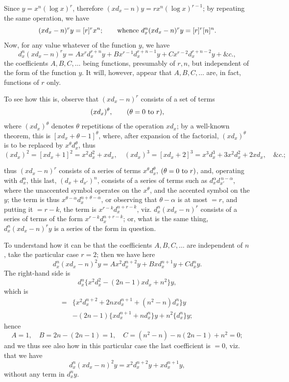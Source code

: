 \documentclass[10pt,twoside]{article}
\begin{document}
Since \(y=x^n(\log x)^r\), therefore \((xd_x-n)y=rx^n(\log x)^{r-1}\);
by repeating the same operation, we have
\[
        (xd_x-n)^r y=[r]^r x^n;\qquad
        \hbox{whence }d_x^n(xd_x-n)^r y=[r]^r[n]^n.
\]
Now, for any value whatever of the function \(y\), we have
\[
d_x^n(xd_x-n)^r y
=Ax^r d_x^{r+n}y+Bx^{r-1}d_x^{r+n-1}y
 +Cx^{r-2}d_x^{r+n-2}y+\&c.,
\]
the coefficients \(A,B,C,\ldots\) being functions, presumably of \(r,n\), but
independent of the form of the function \(y\). It will, however, appear that
\(A,B,C,\ldots\) are, in fact, functions of \(r\) only.

To see how this is, observe that \((xd_x-n)^r\) consists of a set of terms
\[
        (xd_x)^\theta,\qquad (\theta=0\hbox{ to }r),
\]
where \((xd_x)^\theta\) denotes \(\theta\) repetitions of the operation
\(xd_x\); by a well-known theorem, this is
\([xd_x+\theta-1]^\theta\), where, after expansion of the factorial,
\((xd_x)^\theta\) is to be replaced by \(x^\theta d_x^\theta\), thus
\[
(xd_x)^2=[xd_x+1]^2=x^2d_x^2+xd_x,\quad
(xd_x)^3=[xd_x+2]^3=x^3d_x^3+3x^2d_x^2+2xd_x,\quad \&c.;
\]

\newpage

thus \((xd_x-n)^r\) consists of a series of terms \(x^\theta d_x^\theta\),
\((\theta=0\hbox{ to }r)\), and, operating with \(d_x^n\), this last,
\((d_x+d_{x'} )^n\), consists of a series of terms such as
\(d_x^\alpha d_{x'}^{\,n-\alpha}\), where the unaccented symbol operates on
the \(x^\theta\), and the accented symbol on the \(y\); the term is thus
\(x^{\theta-\alpha}d_x^{n+\theta-\alpha}\), or observing that
\(\theta-\alpha\) is at most \(=r\), and putting it \(=r-k\), the term is
\(x^{r-k}d_x^{n+r-k}\), viz. \(d_x^n(xd_x-n)^r\) consists of a series of terms
of the form \(x^{r-k}d_x^{n+r-k}\); or, what is the same thing,
\(d_x^n(xd_x-n)^r y\) is a series of the form in question.

To understand how it can be that the coefficients \(A,B,C,\ldots\) are
independent of \(n\), take the particular case \(r=2\); then we have here
\[
        d_x^n(xd_x-n)^2y=Ax^2d_x^{n+2}y+Bxd_x^{n+1}y+Cd_x^ny.
\]
The right-hand side is
\[
        d_x^n\{x^2d_x^2-(2n-1)xd_x+n^2\}y,
\]
which is
\[
\begin{aligned}
=&\{x^2d_x^{n+2}+2nxd_x^{n+1}+(n^2-n)d_x^n\}y\\
&-(2n-1)\{xd_x^{n+1}+nd_x^n\}y+n^2\{d_x^n\}y;
\end{aligned}
\]
hence
\[
 A=1,\quad B=2n-(2n-1)=1,\quad
 C=(n^2-n)-n(2n-1)+n^2=0;
\]
and we thus see also how in this particular case the last coefficient is \(=0\),
viz. that we have
\[
        d_x^n(xd_x-n)^2y=x^2d_x^{n+2}y+xd_x^{n+1}y,
\]
without any term in \(d_x^ny\).
\end{document}
